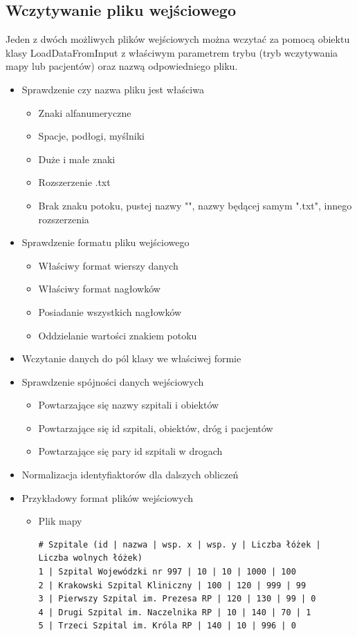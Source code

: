 \documentclass[11pt, a4paper]{article}
\begin{document}
    \subsection{Wczytywanie pliku wejściowego}
Jeden z dwóch możliwych plików wejściowych można wczytać za pomocą obiektu klasy LoadDataFromInput z właściwym parametrem trybu (tryb wczytywania mapy lub pacjentów) oraz nazwą odpowiedniego pliku.

\begin{itemize}
    \item Sprawdzenie czy nazwa pliku jest właściwa
    \begin{itemize}
        \item Znaki alfanumeryczne
        \item Spacje, podłogi, myślniki
        \item Duże i małe znaki
        \item Rozszerzenie .txt
        \item Brak znaku potoku, pustej nazwy "", nazwy będącej samym ".txt", innego rozszerzenia
    \end{itemize}
    \item Sprawdzenie formatu pliku wejściowego
    \begin{itemize}
        \item Właściwy format wierszy danych
        \item Właściwy format nagłowków
        \item Posiadanie wszystkich nagłowków
        \item Oddzielanie wartości znakiem potoku
    \end{itemize}
    
    \item Wczytanie danych do pól klasy we właściwej formie
    \item Sprawdzenie spójności danych wejściowych
    \begin{itemize}
        \item Powtarzające się nazwy szpitali i obiektów
        \item Powtarzające się id szpitali, obiektów, dróg i pacjentów
        \item Powtarzające się pary id szpitali w drogach
    \end{itemize}
    \item Normalizacja identyfiaktorów dla dalszych obliczeń
    \item Przykładowy format plików wejściowych

    \begin{itemize}
    \item Plik mapy
    \begin{lstlisting}
# Szpitale (id | nazwa | wsp. x | wsp. y | Liczba łóżek | Liczba wolnych łóżek)
1 | Szpital Wojewódzki nr 997 | 10 | 10 | 1000 | 100
2 | Krakowski Szpital Kliniczny | 100 | 120 | 999 | 99
3 | Pierwszy Szpital im. Prezesa RP | 120 | 130 | 99 | 0
4 | Drugi Szpital im. Naczelnika RP | 10 | 140 | 70 | 1
5 | Trzeci Szpital im. Króla RP | 140 | 10 | 996 | 0


\end{lstlisting}
\end{itemize}
\end{itemize}
\end{document}
